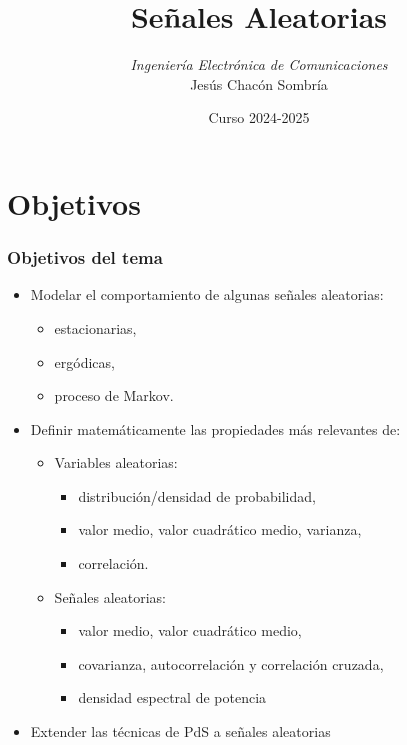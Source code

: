 \documentclass{beamer}
\title[Procesamiento de Señales]{Señales Aleatorias}
\author[Jesús Chacón Sombría] {%
 	\textit{Ingeniería Electrónica de Comunicaciones}\\
 	\vspace{0.6cm}%
	\small Jesús Chacón Sombría%
}%
\institute[DACYA. UCM] {%
	\footnotesize  Departamento de Arquitectura de Computadores y Automática\\
  Universidad Complutense de Madrid
}
\date[Señales Aleatorias] %
{\footnotesize Curso 2024-2025}%
\newcommand{\MyLogo}{%
\begin{textblock}{14}(116.0,0.6)
  \pgfuseimage{logo}
\end{textblock}
}
\numberwithin{section}{part}
\begin{document}
\begin{frame}
  \titlepage
\end{frame}

\newcommand*\oldmacro{}%
\let\oldmacro\insertshorttitle%
\renewcommand*\insertshorttitle{%
\oldmacro\hfill%
}

\AtBeginSection[]{}

\AtBeginSubsection[]{}



\section{Objetivos}

\begin{frame}
  \frametitle{Objetivos del tema}

  \begin{itemize}
    \item Modelar el comportamiento de algunas señales aleatorias:
    \begin{itemize}
      \item estacionarias,
      \item ergódicas, 
      \item proceso de Markov.
    \end{itemize}
    \item Definir matemáticamente las propiedades más relevantes de:
    \begin{itemize}
      \normalsize
      \item Variables aleatorias: 
      \begin{itemize}
        \item distribución/densidad de probabilidad,
        \item valor medio, valor cuadrático medio, varianza,
        \item correlación.
      \end{itemize}
      \item Señales aleatorias:  
      \begin{itemize}
        \item valor medio, valor cuadrático medio, 
        \item covarianza, autocorrelación y correlación cruzada,
        \item densidad espectral de potencia
      \end{itemize}
    \end{itemize}
    \item Extender las técnicas de PdS a señales aleatorias
  \end{itemize}
\end{frame}
\end{document}
